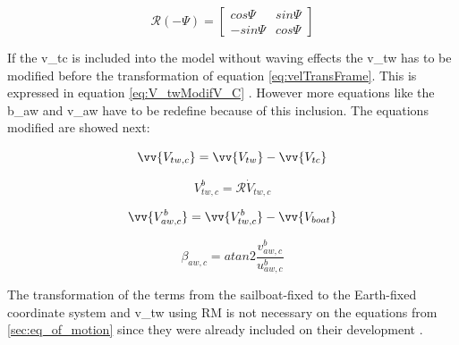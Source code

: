 \begin{equation} \label{eq:RotMat}
    \mathcal{R}(- \Psi)=
    \begin{bmatrix}
    cos \Psi & sin\Psi \\
    -sin \Psi & cos \Psi
    \end{bmatrix}
\end{equation}

If the \acrshort{v_tc} is included into the model without waving effects the \acrshort{v_tw} has to be modified before the transformation of equation \ref{eq:velTransFrame}. This is expressed in equation \ref{eq:V_twModifV_C} \cite{allsopp1998stochastic}. However more equations like the \acrshort{b_aw} and \acrshort{v_aw} have to be redefine because of this inclusion. The equations modified are showed next:\par
\begin{equation}\label{eq:V_twModifV_C}
    \vv{V_{tw,c}}=\vv{V_{tw}}- \vv{V_{tc}}
\end{equation}

\begin{equation}\label{eq:v_twCurBoat}
    V_{tw,c}^b=\mathcal{R} \dot V_{tw,c}
\end{equation}

\begin{equation} \label{eq:VelCurrWind_boat}
    \vv{V_{aw,c}^b}= \vv{V_{tw,c}^b} - \vv{V_{boat}}
\end{equation}

\begin{equation}\label{eq:b_tw_c}
    \beta_{aw,c}= atan2 \frac {v_{aw,c}^b}{u_{aw,c}^b}
\end{equation}

The transformation of the terms from the sailboat-fixed to the Earth-fixed coordinate system and \acrshort{v_tw} using \acrshort{RM} is not necessary on the equations from \ref{sec:eq_of_motion} since they were already included on their development \cite{keuning2004mathematical}.\par  


